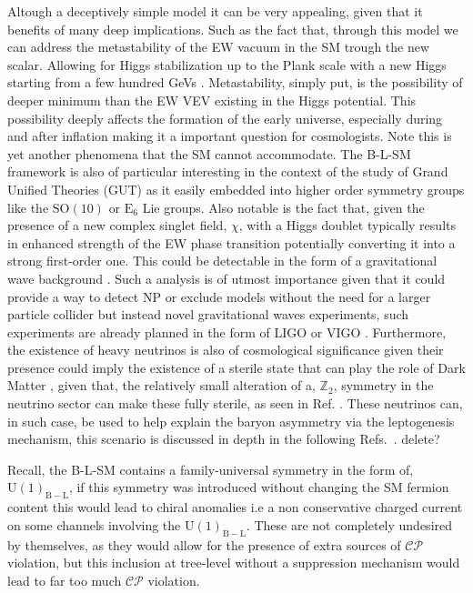 { \color{gray} Altough a deceptively simple model it can be very appealing, given that it benefits of many deep implications. Such as the fact that, through this model we can address the metastability of the EW vacuum in the SM trough the new scalar. Allowing for Higgs stabilization up to the Plank scale with a new Higgs starting from a few hundred GeVs \cite{Degrassi:2012ry}. Metastability, simply put, is the possibility of deeper minimum than the EW VEV existing in the Higgs potential. This possibility deeply affects the formation of the early universe, especially during and after inflation making it a important question for cosmologists. Note this is yet another phenomena that the SM cannot accommodate. The B-L-SM framework is also of particular interesting in the context of the study of Grand Unified Theories (GUT) as it easily embedded into higher order symmetry groups like the $\mathrm{SO(10)}$ \cite{Chanowitz:1977ye} or $\mathrm{E}_6$ \cite{Achiman:1978vg} Lie groups. Also notable is the fact that, given the presence of a new complex singlet field, $\chi$, with a Higgs doublet typically results in enhanced strength of the EW phase transition potentially converting it into a strong first-order one. This could be detectable in the form of a gravitational wave background \cite{Barger:2008jx}. Such a analysis is of utmost importance given that it could provide a way to detect NP or exclude models without the need for a larger particle collider but instead novel gravitational waves experiments, such experiments are already planned in the form of LIGO or VIGO \cite{Abbott2020}. Furthermore, the existence of heavy neutrinos is also of cosmological significance given their presence could imply the existence of a sterile state that can play the role of Dark Matter \cite{Kaneta:2016vkq}, given that, the relatively small alteration of a, $\mathbb{Z}_2$, symmetry in the neutrino sector can make these fully sterile, as seen in Ref. \cite{Okada:2018ktp}. These neutrinos can, in such case, be used to help explain the baryon asymmetry via the leptogenesis mechanism, this scenario is discussed in depth in the following Refs.~\cite{Fukugita:1986hr}.} {\color{red} delete?} 

Recall, the B-L-SM contains a family-universal symmetry in the form of, $\mathrm{U(1)_{B-L}}$, if this symmetry was introduced without changing the SM fermion content this would lead to chiral anomalies i.e a non conservative charged current on some channels involving the $\mathrm{U(1)_{B-L}}$. These are not completely undesired by themselves, as they would allow for the presence of extra sources of $\mathcal{CP}$ violation, but this inclusion at tree-level without a suppression mechanism would lead to far too much $\mathcal{CP}$ violation. 

